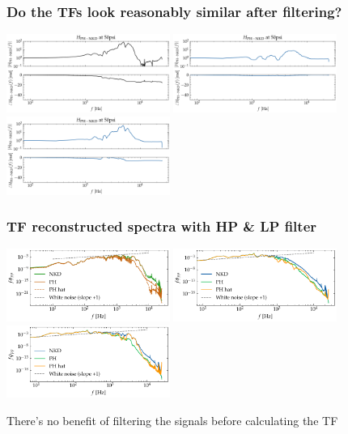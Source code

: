 \documentclass[aspectratio=169,9pt]{beamer}
\begin{document}
\begin{frame}
    \frametitle{Do the TFs look reasonably similar after filtering?}
        \centering
        \includegraphics[width=0.4\textwidth]{sanity/50psi/PH-NKD/H_50psi_nn_filt.png}
        \includegraphics[width=0.4\textwidth]{sanity/50psi/PH-NKD/H_50psi_fn_filt.png}
        \includegraphics[width=0.4\textwidth]{sanity/50psi/PH-NKD/H_50psi_an_filt.png}
\end{frame}

\begin{frame}
    \frametitle{TF reconstructed spectra with HP \& LP filter}
        \centering
        \includegraphics[width=0.4\textwidth]{sanity/50psi/PH-NKD/calib_spectra_50psi_nn_filt_recon.pdf}
        \includegraphics[width=0.4\textwidth]{sanity/50psi/PH-NKD/calib_spectra_50psi_fn_filt_recon.pdf}
        \includegraphics[width=0.4\textwidth]{sanity/50psi/PH-NKD/calib_spectra_50psi_an_filt_recon.pdf}

    There's no benefit of filtering the signals before calculating the TF
\end{frame}
\end{document}
